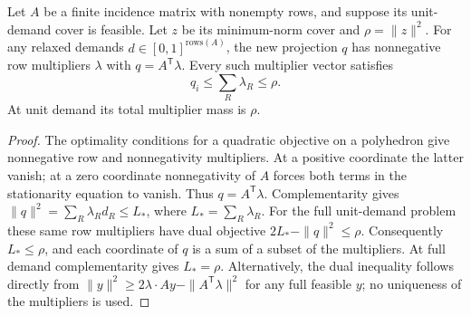 \begin{lemma}
\label{lem:dual-mass}
Let $A$ be a finite incidence matrix with nonempty rows, and suppose its
unit-demand cover is feasible.  Let $z$ be its minimum-norm cover and
$\rho=\|z\|^2$.  For any relaxed demands $d\in[0,1]^{\mathrm{rows}(A)}$,
the new projection $q$ has nonnegative row multipliers $\lambda$ with
$q=A^\mathsf T\lambda$.  Every such multiplier vector satisfies
\[
 q_i\le\sum_R\lambda_R\le\rho.
\]
At unit demand its total multiplier mass is $\rho$.
\end{lemma}
\begin{proof}
The optimality conditions for a quadratic objective on a polyhedron give
nonnegative row and nonnegativity multipliers.  At a positive coordinate
the latter vanish; at a zero coordinate nonnegativity of $A$ forces both
terms in the stationarity equation to vanish.  Thus $q=A^\mathsf T\lambda$.
Complementarity gives $\|q\|^2=\sum_R\lambda_R d_R\le L_*$, where
$L_*=\sum_R\lambda_R$.  For the full unit-demand problem these same row
multipliers have dual objective $2L_*-\|q\|^2\le\rho$.  Consequently
$L_*\le\rho$, and each coordinate of $q$ is a sum of a subset of the
multipliers.  At full demand complementarity gives $L_*=\rho$.
Alternatively, the dual inequality follows directly from
$\|y\|^2\ge2\lambda\cdot Ay-\|A^\mathsf T\lambda\|^2$ for any full
feasible $y$; no uniqueness of the multipliers is used.
\end{proof}

